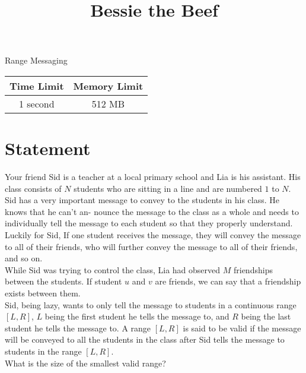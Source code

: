 \documentclass{article}
\begin{document}
\title{\vspace{-5ex}Bessie the Beef}
\author{\vspace{-5ex}}
\date{\vspace{-5ex}}
\pagestyle{fancy}
\fancyhf{}

\begin{center}
\huge{Range Messaging}\small\\
\vspace{5ex}
\begin{tabular}{|c|c|}
\hline
Time Limit & Memory Limit \\
\hline
1 second & 512 MB \\

\hline
\end{tabular}
\end{center}
\section*{Statement}
Your friend Sid is a teacher at a local primary school and Lia is his assistant. His class consists of $N$
students who are sitting in a line and are numbered $1$ to $N$. \\

Sid has a very important message to convey to the students in his class. He knows that he can’t an-
nounce the message to the class as a whole and needs to individually tell the message to each student so
that they properly understand. Luckily for Sid, If one student receives the message, they will convey the
message to all of their friends, who will further convey the message to all of their friends, and so on. \\

While Sid was trying to control the class, Lia had observed $M$ friendships between the students. If
student $u$ and $v$ are friends, we can say that a friendship exists between them. \\

Sid, being lazy, wants to only tell the message to students in a continuous range $[L, R]$, $L$ being the
first student he tells the message to, and $R$ being the last student he tells the message to. A range $[L, R]$
is said to be valid if the message will be conveyed to all the students in the class after Sid tells the message
to students in the range $[L, R]$. \\

What is the size of the smallest valid range?
\end{document}
